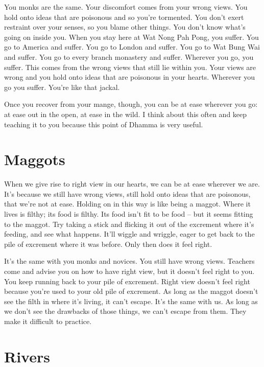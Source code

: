 You monks are the same. Your discomfort comes from your wrong views. You hold onto ideas that are poisonous and so you're tormented. You don't exert restraint over your senses, so you blame other things. You don't know what's going on inside you. When you stay here at Wat Nong Pah Pong, you suffer. You go to America and suffer. You go to London and suffer. You go to Wat Bung Wai and suffer. You go to every branch monastery and suffer. Wherever you go, you suffer. This comes from the wrong views that still lie within you. Your views are wrong and you hold onto ideas that are poisonous in your hearts. Wherever you go you suffer. You're like that jackal. 

Once you recover from your mange, though, you can be at ease wherever you go: at ease out in the open, at ease in the wild. I think about this often and keep teaching it to you because this point of Dhamma is very useful. 

\clearpage

\section{Maggots}

When we give rise to right view in our hearts, we can be at ease wherever we are. It's because we still have wrong views, still hold onto ideas that are poisonous, that we're not at ease. Holding on in this way is like being a maggot. Where it lives is filthy; its food is filthy. Its food isn't fit to be food -- but it seems fitting to the maggot. Try taking a stick and flicking it out of the excrement where it's feeding, and see what happens. It'll wiggle and wriggle, eager to get back to the pile of excrement where it was before. Only then does it feel right. 

It's the same with you monks and novices. You still have wrong views. Teachers come and advise you on how to have right view, but it doesn't feel right to you. You keep running back to your pile of excrement. Right view doesn't feel right because you're used to your old pile of excrement. As long as the maggot doesn't see the filth in where it's living, it can't escape. It's the same with us. As long as we don't see the drawbacks of those things, we can't escape from them. They make it difficult to practice.

\clearpage

\section{Rivers}

